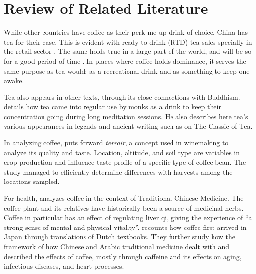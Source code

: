 \chapter{Review of Related Literature}\label{chap:rrl}

While other countries have coffee as their perk-me-up drink of choice, China has
tea for their case. This is evident with ready-to-drink (RTD) tea sales
specially in the retail sector
\autocite{international_coffee_council_coffee_2015}. The same holds true in a
large part of the world, and will be so for a good period of time
\autocite{CITEME}. In places where coffee holds dominance, it serves the same
purpose as tea would: as a recreational drink and as something to keep one
awake.


Tea also appears in other texts, through its close connections with Buddhism.
\textcite{keischnick_impact_2003} details how tea came into regular use by monks
as a drink to keep their concentration going during long meditation sessions. He
also describes here tea's various appearances in legends and ancient writing
such as \textcite{lu_classic_1974} on The Classic of Tea.

In analyzing coffee, \textcite{silva_characterization_2014} puts forward
\emph{terroir}, a concept used in winemaking to analyze its quality and taste.
Location, altitude, and soil type are variables in crop production and influence
taste profile of a specific type of coffee bean. The study managed to
efficiently determine differences with harvests among the locations sampled.



For health, \textcite{dharmananda_coffee_2003} analyzes coffee in the context of
Traditional Chinese Medicine. The coffee plant and its relatives have
historically been a source of medicinal herbs. Coffee in particular has an
effect of regulating liver qi, giving the experience of ``a strong sense of
mental and physical vitality''. \textcite{namba_historical_2001} recounts how
coffee first arrived in Japan through translations of Dutch textbooks. They
further study how the framework of how Chinese and Arabic traditional medicine
dealt with and described the effects of coffee, mostly through caffeine and its
effects on aging, infectious diseases, and heart processes.

